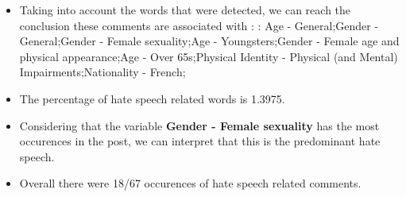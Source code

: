 \documentclass[11pt]{article}
\begin{document}
\begin{itemize}\item Taking into account the words that were detected, we can reach the conclusion these comments are associated with : : Age - General;Gender - General;Gender - Female sexuality;Age - Youngsters;Gender - Female age and physical appearance;Age - Over 65s;Physical Identity - Physical (and Mental) Impairments;Nationality - French;%

\item The percentage of hate speech related words is 1.3975.

\item Considering that the variable \textbf{Gender - Female sexuality} has the most occurences in the post, we can interpret that this is the predominant hate speech.

\item Overall there were 18/67 occurences of hate speech related comments.\end{itemize}
\end{document}

